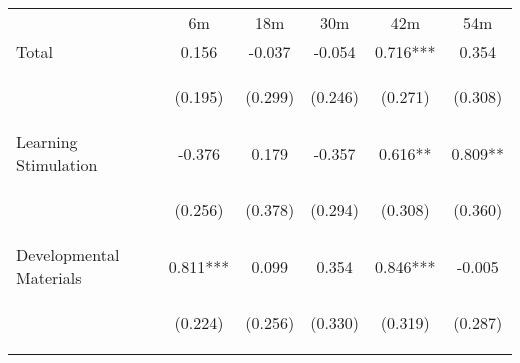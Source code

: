 \begin{tabular}{lccccc}
\hline \noalign{\smallskip} & 6m & 18m & 30m & 42m & 54m\\
\noalign{\smallskip}\hline \noalign{\smallskip}Total & 0.156 & -0.037 & -0.054 & 0.716*** & 0.354\\
 & \begin{footnotesize}(0.195)\end{footnotesize} & \begin{footnotesize}(0.299)\end{footnotesize} & \begin{footnotesize}(0.246)\end{footnotesize} & \begin{footnotesize}(0.271)\end{footnotesize} & \begin{footnotesize}(0.308)\end{footnotesize}\\
\noalign{\smallskip}Learning Stimulation & -0.376 & 0.179 & -0.357 & 0.616** & 0.809**\\
 & \begin{footnotesize}(0.256)\end{footnotesize} & \begin{footnotesize}(0.378)\end{footnotesize} & \begin{footnotesize}(0.294)\end{footnotesize} & \begin{footnotesize}(0.308)\end{footnotesize} & \begin{footnotesize}(0.360)\end{footnotesize}\\
\noalign{\smallskip}Developmental Materials & 0.811*** & 0.099 & 0.354 & 0.846*** & -0.005\\
 & \begin{footnotesize}(0.224)\end{footnotesize} & \begin{footnotesize}(0.256)\end{footnotesize} & \begin{footnotesize}(0.330)\end{footnotesize} & \begin{footnotesize}(0.319)\end{footnotesize} & \begin{footnotesize}(0.287)\end{footnotesize}\\

\end{tabular}
